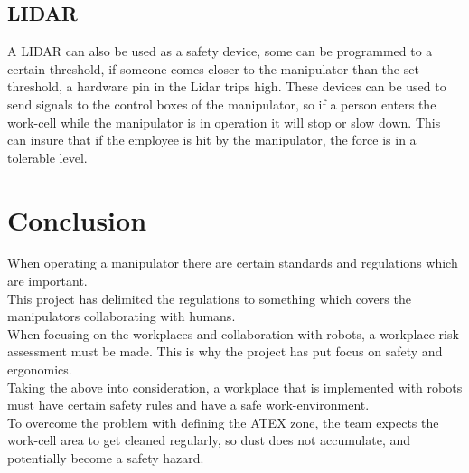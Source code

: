\subsection{LIDAR}
A LIDAR can also be used as a safety device\cite{Lidar}, some can be programmed to a certain threshold, if someone comes closer to the manipulator than the set threshold, a hardware pin in the Lidar trips high. These devices can be used to send signals to the control boxes of the manipulator, so if a person enters the work-cell while the manipulator is in operation it will stop or slow down. This can insure that if the employee is hit by the manipulator, the force is in a tolerable level.\\



\section{Conclusion}

When operating a manipulator there are certain standards and regulations which are important.\\
This project has delimited the regulations to something which covers the manipulators collaborating with humans.\\

When focusing on the workplaces and collaboration with robots, a workplace risk assessment must be made. This is why the project has put focus on safety and ergonomics. \\

Taking the above into consideration, a workplace that is implemented with robots must have certain safety rules and have a safe work-environment.\\

To overcome the problem with defining the ATEX zone, the team expects the work-cell area to get cleaned regularly, so dust does not accumulate, and potentially become a safety hazard.\\

